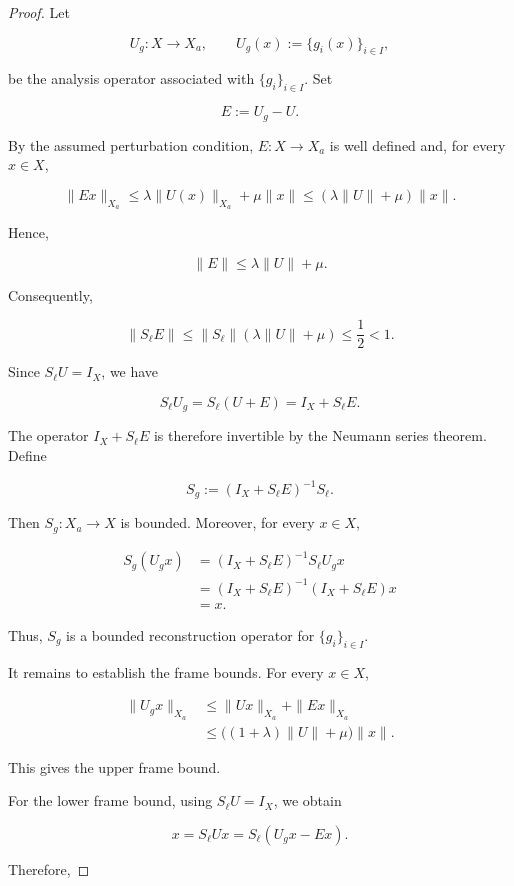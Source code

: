 \documentclass[12pt]{article}
\theoremstyle{definition}
\theoremstyle{remark}
\begin{document}
\begin{proof}
	Let
	
	$$
	U_g:X\to X_a,
	\qquad
	U_g(x):=\{g_i(x)\}_{i\in I},
	$$
	
	be the analysis operator associated with \(\{g_i\}_{i\in I}\). Set
	
	$$
	E:=U_g-U.
	$$
	
	By the assumed perturbation condition, \(E:X\to X_a\) is well defined and,
	for every \(x\in X\),
	
	$$
	\|Ex\|_{X_a}
	\leq
	\lambda\|U(x)\|_{X_a}+\mu\|x\|
	\leq
	(\lambda\|U\|+\mu)\|x\|.
	$$
	
	Hence,
	
	$$
	\|E\|\leq\lambda\|U\|+\mu.
	$$
	
	Consequently,
	
	$$
	\|S_\ell E\|
	\leq
	\|S_\ell\|(\lambda\|U\|+\mu)
	\leq\frac12<1.
	$$
	
	Since \(S_\ell U=I_X\), we have
	
	$$
	S_\ell U_g
	=
	S_\ell(U+E)
	=
	I_X+S_\ell E.
	$$
	
	The operator \(I_X+S_\ell E\) is therefore invertible by the Neumann
	series theorem. Define
	
	$$
	S_g:=(I_X+S_\ell E)^{-1}S_\ell.
	$$
	
	Then \(S_g:X_a\to X\) is bounded. Moreover, for every \(x\in X\),
	
	$$
	\begin{aligned}
		S_g(U_gx)
		&=
		(I_X+S_\ell E)^{-1}S_\ell U_gx\\
		&=
		(I_X+S_\ell E)^{-1}(I_X+S_\ell E)x\\
		&=x.
	\end{aligned}
	$$
	
	Thus, \(S_g\) is a bounded reconstruction operator for
	\(\{g_i\}_{i\in I}\).
	
	It remains to establish the frame bounds. For every \(x\in X\),
	
	$$
	\begin{aligned}
		\|U_gx\|_{X_a}
		&\leq
		\|Ux\|_{X_a}+\|Ex\|_{X_a}\\
		&\leq
		\bigl((1+\lambda)\|U\|+\mu\bigr)\|x\|.
	\end{aligned}
	$$
	
	This gives the upper frame bound.
	
	For the lower frame bound, using \(S_\ell U=I_X\), we obtain
	
	$$
	x=S_\ell Ux=S_\ell(U_gx-Ex).
	$$
	
	Therefore,
	

\end{proof}
\end{document}
